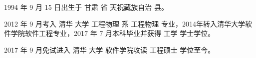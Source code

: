 
\begin{resume}


  1994 年 9 月 15 日出生于 甘肃 省 天祝藏族自治 县。

  2012 年 9 月考入 清华 大学 工程物理 系 工程物理 专业，2014年转入清华大学软件学院软件工程专业，2017 年 7 月本科毕业并获得 工学 学士学位。

  2017 年 9 月免试进入 清华 大学 软件学院攻读 工程硕士 学位至今。


\end{resume}
